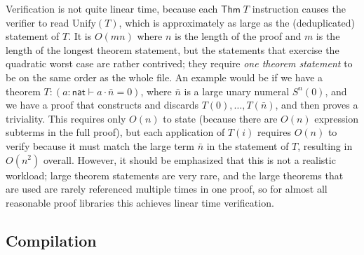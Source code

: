 \documentclass[runningheads]{llncs}
\begin{document}
Verification is not quite linear time, because each $\mathsf{Thm}\;T$ instruction causes the verifier to read $\mathrm{Unify}(T)$, which is approximately as large as the (deduplicated) statement of $T$. It is $O(mn)$ where $n$ is the length of the proof and $m$ is the length of the longest theorem statement, but the statements that exercise the quadratic worst case are rather contrived; they require \emph{one theorem statement} to be on the same order as the whole file. An example would be if we have a theorem $T:(a:\mathsf{nat}\vdash a\cdot \bar n=0)$, where $\bar n$ is a large unary numeral $S^n(0)$, and we have a proof that constructs and discards $T(0),\dots,T(\bar n)$, and then proves a triviality. This requires only $O(n)$ to state (because there are $O(n)$ expression subterms in the full proof), but each application of $T(i)$ requires $O(n)$ to verify because it must match the large term $\bar n$ in the statement of $T$, resulting in $O(n^2)$ overall. However, it should be emphasized that this is not a realistic workload; large theorem statements are very rare, and the large theorems that are used are rarely referenced multiple times in one proof, so for almost all reasonable proof libraries this achieves linear time verification.

\subsection{Compilation}
\end{document}
